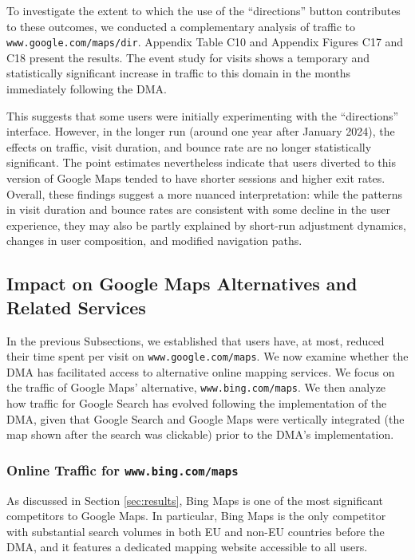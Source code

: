 \documentclass[11pt]{article}
\begin{document}
	To investigate the extent to which the use of the ``directions'' button contributes to these outcomes, we conducted a complementary analysis of traffic to \texttt{www.google.com/maps/dir}. Appendix Table C10 and Appendix Figures C17 and C18 present the results. The event study for visits shows a temporary and statistically significant increase in traffic to this domain in the months immediately following the DMA.
	
	This suggests that some users were initially experimenting with the ``directions'' interface. However, in the longer run (around one year after January 2024), the effects on traffic, visit duration, and bounce rate are no longer statistically significant. The point estimates nevertheless indicate that users diverted to this version of Google Maps tended to have shorter sessions and higher exit rates. Overall, these findings suggest a more nuanced interpretation: while the patterns in visit duration and bounce rates are consistent with some decline in the user experience, they may also be partly explained by short-run adjustment dynamics, changes in user composition, and modified navigation paths.
	
	
	\subsection{Impact on Google Maps Alternatives and Related Services} \label{subsec:traffic_google_bing}  
	
	In the previous Subsections, we established that users have, at most, reduced their time spent per visit on \texttt{www.google.com/maps}. We now examine whether the DMA has facilitated access to alternative online mapping services. We focus on the traffic of Google Maps’ alternative, \texttt{www.bing.com/maps}. We then analyze how traffic for Google Search has evolved following the implementation of the DMA, given that Google Search and Google Maps were vertically integrated (the map shown after the search was clickable)  prior to the DMA’s implementation.
	
	\subsubsection{Online Traffic for \texttt{www.bing.com/maps}} \label{subsec: bing maps}
	
	As discussed in Section \ref{sec:results}, Bing Maps is one of the most significant competitors to Google Maps. In particular, Bing Maps is the only competitor with substantial search volumes in both EU and non-EU countries before the DMA, and it features a dedicated mapping website accessible to all users.
	
\end{document}
